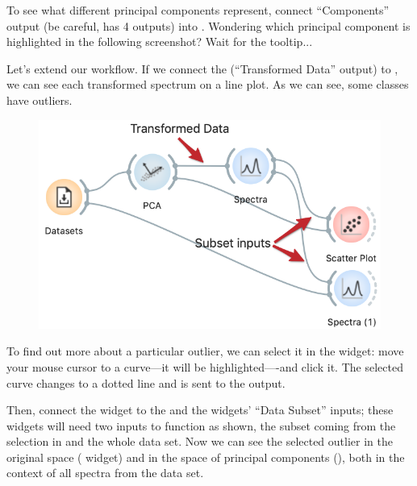 To see what different principal components represent, connect  ``Components'' output (be careful,  has 4 outputs) into . Wondering which principal component is highlighted in the following screenshot? Wait for the tooltip...

\clearpage

Let's extend our workflow. If we connect the  (``Transformed Data'' output) to , we can see each transformed spectrum on a line plot. As we can see, some classes have outliers.

\begin{figure}
    \includegraphics[scale=0.4]{graphics/ch-spectral_PCA/workflow2.png}
\end{figure}

To find out more about a particular outlier, we can select it in the  widget: move your mouse cursor to a curve---it will be highlighted—-and click it. The selected curve changes to a dotted line and is sent to the output.

Then, connect the  widget to the  and the  widgets' ``Data Subset'' inputs; these widgets will need two inputs to function as shown, the subset coming from the selection in  and the whole data set. Now we can see the selected outlier in the original space ( widget) and in the space of principal components (), both in the context of all spectra from the data set.

